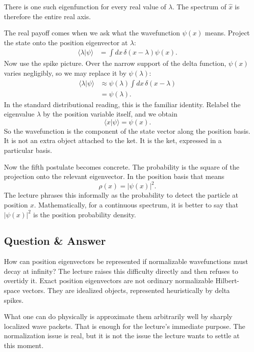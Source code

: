There is one such eigenfunction for every real value of \(\lambda\). The spectrum of \(\hat x\) is therefore the entire real axis.

The real payoff comes when we ask what the wavefunction \(\psi(x)\) means. Project the state onto the position eigenvector at \(\lambda\):
\begin{align}
\langle \lambda|\psi\rangle
&=
\int dx\, \delta(x-\lambda)\psi(x).
\end{align}
Now use the spike picture. Over the narrow support of the delta function, \(\psi(x)\) varies negligibly, so we may replace it by \(\psi(\lambda)\):
\begin{align}
\langle \lambda|\psi\rangle
&\approx
\psi(\lambda)\int dx\, \delta(x-\lambda) \\
&=
\psi(\lambda).
\end{align}
In the standard distributional reading, this is the familiar identity. Relabel the eigenvalue \(\lambda\) by the position variable itself, and we obtain
\begin{equation}
\langle x|\psi\rangle=\psi(x).
\end{equation}
So the wavefunction is the component of the state vector along the position basis. It is not an extra object attached to the ket. It is the ket, expressed in a particular basis.

Now the fifth postulate becomes concrete. The probability is the square of the projection onto the relevant eigenvector. In the position basis that means
\begin{equation}
\rho(x)=|\psi(x)|^2.
\end{equation}
The lecture phrases this informally as the probability to detect the particle at position \(x\). Mathematically, for a continuous spectrum, it is better to say that \(|\psi(x)|^2\) is the position probability density.

\subsection{Question \& Answer}

How can position eigenvectors be represented if normalizable wavefunctions must decay at infinity? The lecture raises this difficulty directly and then refuses to overtidy it. Exact position eigenvectors are not ordinary normalizable Hilbert-space vectors. They are idealized objects, represented heuristically by delta spikes.

What one can do physically is approximate them arbitrarily well by sharply localized wave packets. That is enough for the lecture's immediate purpose. The normalization issue is real, but it is not the issue the lecture wants to settle at this moment.

